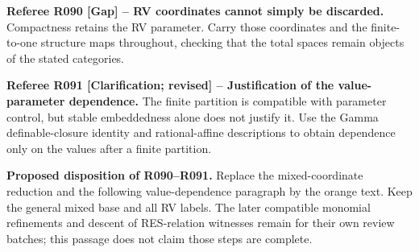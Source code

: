 \documentclass[12pt]{amsart}
\theoremstyle{remark}
\theoremstyle{definition}
\numberwithin{equation}{section}
\theoremstyle{plain}
\begin{document}
\medskip
{\normalfont\small\color{RefereePurple}
\noindent\textbf{Referee R090 [Gap] --
RV coordinates cannot simply be discarded.}
Compactness retains the RV parameter. Carry those
coordinates and the finite-to-one structure maps throughout,
checking that the total spaces remain objects of the stated
categories.\par
\medskip
\noindent\textbf{Referee R091 [Clarification; revised] --
Justification of the value-parameter dependence.}
The finite partition is compatible with parameter control,
but stable embeddedness alone does not justify it. Use the
Gamma definable-closure identity and rational-affine
descriptions to obtain dependence only on the values after
a finite partition.\par}
\medskip
{\normalfont\small\color{ProposalOrange}
\noindent\textbf{Proposed disposition of R090--R091.}
Replace the mixed-coordinate reduction and the following
value-dependence paragraph by the orange text.
Keep the general mixed base and all RV labels.
The later compatible monomial refinements and descent of
RES-relation witnesses remain for their own review batches;
this passage does not claim those steps are complete.}
\end{document}
